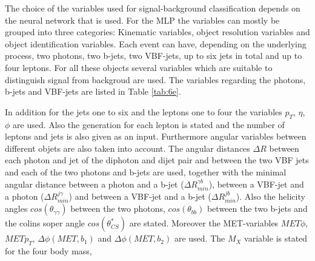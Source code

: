The choice of the variables used for signal-background classification depends on the neural network that is used. For the MLP the variables can mostly be grouped into three
categories: Kinematic variables, object resolution variables and object identification variables. Each event can have, depending on the underlying process, two photons, two b-jets,
two VBF-jets, up to six jets in total and up to four leptons. For all these objects several variables which are suitable to distinguish signal from backgroud are used.
The variables regarding the photons, b-jets and VBF-jets are listed in Table \ref{tab:6e}.


In addition for the jets one to six and the leptons one to four the variables $p_T$, $\eta$, $\phi$ are used. Also the generation for each lepton is stated and the number of leptons and jets is
also given as an input. Furthermore angular variables between different objets are also taken into account. The angular distances $\Delta R$ between each photon and jet of the diphoton and dijet pair 
and between the two VBF jets and each of the two photons and b-jets are used, together with the minimal angular distance between a photon and a b-jet ($\Delta R_{min}^{\gamma b}$), between a VBF-jet and a photon
($\Delta R_{min}^{j \gamma}$) and between a VBF-jet and a b-jet ($\Delta R_{min}^{j b}$).
Also the helicity angles $cos(\theta_{\gamma \gamma})$ between the two photons, $cos(\theta_{bb})$ between the two b-jets and the colins soper angle $cos(\theta_{CS}^*)$ are stated.
Moreover the MET-variables $MET \phi$, $MET p_T$, $\Delta \phi (MET, b_1)$ and $\Delta \phi (MET, b_2)$ are used. The $M_X$ variable is stated for the four body mass,

